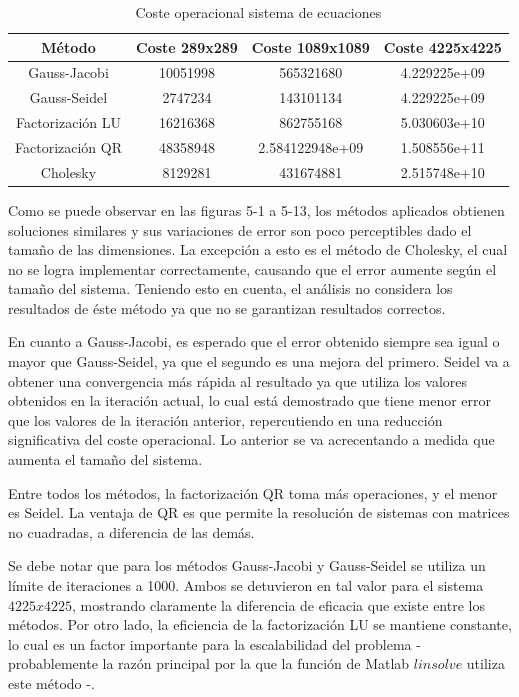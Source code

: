\documentclass{memoria}
\begin{document}
\begin{table}[]
\centering
\begin{tabular}{|c|c|c|c|}
\hline
\textbf{Método} & \textbf{Coste 289x289} & \textbf{Coste 1089x1089} & \textbf{Coste 4225x4225}\\ \hline
Gauss-Jacobi       & 10051998     & 565321680 & 4.229225e+09\\ \hline
Gauss-Seidel      & 2747234     & 143101134 & 4.229225e+09\\ \hline
Factorización LU & 16216368 & 862755168 & 5.030603e+10\\ \hline
Factorización QR & 48358948 & 2.584122948e+09 & 1.508556e+11\\ \hline
Cholesky         & 8129281     & 431674881 & 2.515748e+10\\ \hline
\end{tabular}
\caption{Coste operacional sistema de ecuaciones}
    \label{tab:my_label}
\end{table}



Como se puede observar en las figuras 5-1 a 5-13, los métodos aplicados obtienen soluciones similares y sus variaciones de error son poco perceptibles dado el tamaño de las dimensiones. La excepción a esto es el método de Cholesky, el cual no se logra implementar correctamente, causando que el error aumente según el tamaño del sistema. Teniendo esto en cuenta, el análisis no considera los resultados de éste método ya que no se garantizan resultados correctos.

En cuanto a Gauss-Jacobi, es esperado que el error obtenido siempre sea igual o mayor que Gauss-Seidel, ya que el segundo es una mejora del primero. Seidel va a obtener una convergencia más rápida al resultado ya que utiliza los valores obtenidos en la iteración actual, lo cual está demostrado que tiene menor error que los valores de la iteración anterior, repercutiendo en una reducción significativa del coste operacional. Lo anterior se va acrecentando a medida que aumenta el tamaño del sistema.

Entre todos los métodos, la factorización QR toma más operaciones, y el menor es Seidel. La ventaja de QR es que permite la resolución de sistemas con matrices no cuadradas, a diferencia de las demás.

Se debe notar que para los métodos Gauss-Jacobi y Gauss-Seidel se utiliza un límite de iteraciones a 1000. Ambos se detuvieron en tal valor para el sistema $4225x4225$, mostrando claramente la diferencia de eficacia que existe entre los métodos. Por otro lado, la eficiencia de la factorización LU se mantiene constante, lo cual es un factor importante para la escalabilidad del problema - probablemente la razón principal por la que la función de Matlab $linsolve$ utiliza este método -.
\end{document}
